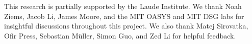 This research is partially supported by the Laude Institute. We thank Noah Ziems, Jacob Li, James Moore, and the MIT OASYS and MIT DSG labs for insightful discussions throughout this project. We also thank Matej Sirovatka, Ofir Press, Sebastian Müller, Simon Guo, and Zed Li for helpful feedback.
